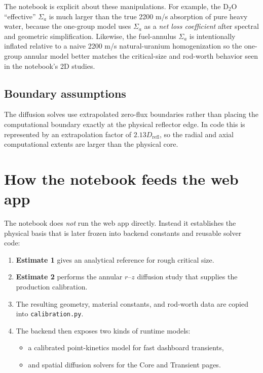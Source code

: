 \documentclass[11pt]{article}
\begin{document}
The notebook is explicit about these manipulations.  For example, the D$_2$O
``effective'' $\Sigma_a$ is much larger than the true 2200 m/s absorption of
pure heavy water, because the one-group model uses $\Sigma_a$ as a \emph{net
loss coefficient} after spectral and geometric simplification.  Likewise, the
fuel-annulus $\Sigma_a$ is intentionally inflated relative to a naive
2200 m/s natural-uranium homogenization so the one-group annular model better
matches the critical-size and rod-worth behavior seen in the notebook's 2D
studies.

\subsection{Boundary assumptions}

The diffusion solves use extrapolated zero-flux boundaries rather than placing
the computational boundary exactly at the physical reflector edge.  In code this
is represented by an extrapolation factor of $2.13 D_{\mathrm{refl}}$, so the
radial and axial computational extents are larger than the physical core.

\section{How the notebook feeds the web app}

The notebook does \emph{not} run the web app directly.  Instead it establishes
the physical basis that is later frozen into backend constants and reusable
solver code:

\begin{enumerate}
  \item \textbf{Estimate 1} gives an analytical reference for rough critical size.
  \item \textbf{Estimate 2} performs the annular $r$--$z$ diffusion study that
        supplies the production calibration.
  \item The resulting geometry, material constants, and rod-worth data are copied
        into \texttt{calibration.py}.
  \item The backend then exposes two kinds of runtime models:
        \begin{itemize}
          \item a calibrated point-kinetics model for fast dashboard transients,
          \item and spatial diffusion solvers for the Core and Transient pages.
        \end{itemize}
\end{enumerate}
\end{document}

